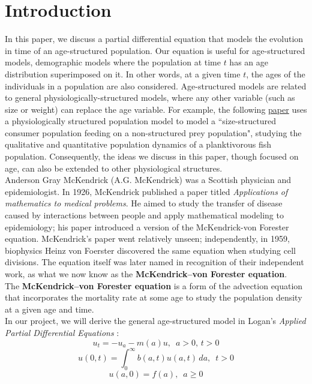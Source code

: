 \section{Introduction}

In this paper, we discuss a partial differential equation that models the evolution in time of an age-structured population. Our equation is useful for age-structured models, demographic models where the population at time $t$ has an age distribution superimposed on it. In other words, at a given time $t$, the ages of the individuals in a population are also considered. Age-structured models are related to general physiologically-structured models, where any other variable (such as size or weight) can replace the age variable. For example, the following \href{https://www.jstor.org/stable/3547254?seq=1}{paper} uses a physiologically structured population model to model a ``size-structured consumer population feeding on a non-structured prey population", studying the qualitative and quantitative population dynamics of a planktivorous fish population. Consequently, the ideas we discuss in this paper, though focused on age, can also be extended to other physiological structures. \\


Anderson Gray McKendrick (A.G. McKendrick) was a Scottish physician and epidemiologist. In 1926, McKendrick published a paper titled \textit{Applications of mathematics to medical problems}. He aimed to study the transfer of disease caused by interactions between people and apply mathematical modeling to epidemiology; his paper introduced a version of the McKendrick-von Forester equation. \cite{mck1925} McKendrick's paper went relatively unseen; independently, in 1959, biophysics Heinz von Foerster discovered the same equation when studying cell divisions. \cite{keyfitz_keyfitz} The equation itself was later named in recognition of their independent work, as what we now know as the \textbf{McKendrick–von Forester equation}. \\

The \textbf{McKendrick–von Forester equation} is a form of the advection equation that incorporates the mortality rate at some age to study the population density at a given age and time. \\

In our project, we will derive the general age-structured model in Logan's \textit{Applied Partial Differential Equations} \cite{logan}:
\[ u_t = -u_a-m(a)u, \, \, \, a>0, \, t>0\]
\[ u(0,t) = \int_0^{\infty}b(a,t)u(a, t) \, da, \, \, \, t>0\]
\[ u(a, 0)=f(a), \, \, \, a \geq 0\]

